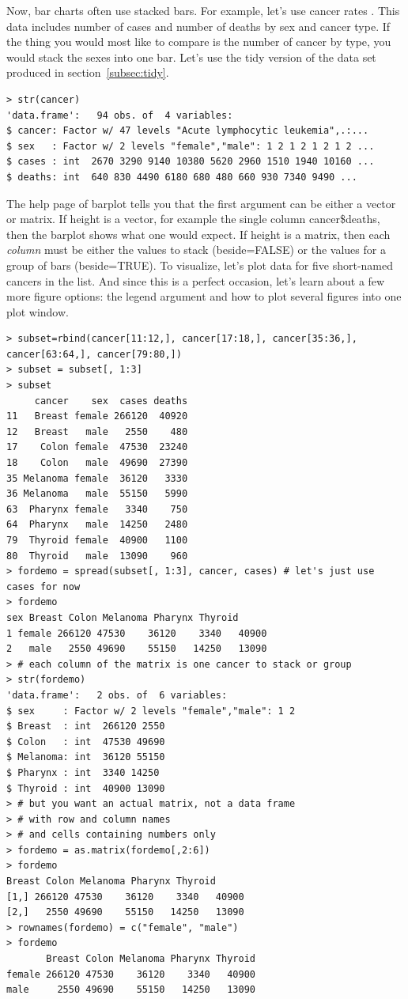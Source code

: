 \documentclass{report}
\newcommand{\code}[1]{\textsf{\ttfamily #1}}
\begin{document}
	Now, bar charts often use stacked bars. For example, let's use cancer rates \cite{cancer}. This data includes number of cases and number of deaths by sex and cancer type. If the thing you would most like to compare is the number of cancer by type, you would stack the sexes into one bar. Let's use the tidy version of the data set produced in section~\ref{subsec:tidy}.
	\begin{verbatim}
> str(cancer)
'data.frame':   94 obs. of  4 variables:
$ cancer: Factor w/ 47 levels "Acute lymphocytic leukemia",.:...
$ sex   : Factor w/ 2 levels "female","male": 1 2 1 2 1 2 1 2 ...
$ cases : int  2670 3290 9140 10380 5620 2960 1510 1940 10160 ...
$ deaths: int  640 830 4490 6180 680 480 660 930 7340 9490 ...
	\end{verbatim}
	The help page of \code{barplot} tells you that the first argument can be either a \code{vector} or \code{matrix}. If \code{height} is a \code{vector}, for example the single column \code{cancer\$deaths}, then the barplot shows what one would expect. If \code{height} is a \code{matrix}, then each \emph{column} must be either the values to stack (\code{beside=FALSE}) or the values for a group of bars (\code{beside=TRUE}). To visualize, let's plot data for five short-named cancers in the list. And since this is a perfect occasion, let's learn about a few more figure options: the \code{legend} argument and how to plot several figures into one plot window.
	\begin{verbatim}
> subset=rbind(cancer[11:12,], cancer[17:18,], cancer[35:36,], cancer[63:64,], cancer[79:80,])
> subset = subset[, 1:3] 
> subset
     cancer    sex  cases deaths
11   Breast female 266120  40920
12   Breast   male   2550    480
17    Colon female  47530  23240
18    Colon   male  49690  27390
35 Melanoma female  36120   3330
36 Melanoma   male  55150   5990
63  Pharynx female   3340    750
64  Pharynx   male  14250   2480
79  Thyroid female  40900   1100
80  Thyroid   male  13090    960
> fordemo = spread(subset[, 1:3], cancer, cases) # let's just use cases for now
> fordemo
sex Breast Colon Melanoma Pharynx Thyroid
1 female 266120 47530    36120    3340   40900
2   male   2550 49690    55150   14250   13090
> # each column of the matrix is one cancer to stack or group
> str(fordemo)
'data.frame':   2 obs. of  6 variables:
$ sex     : Factor w/ 2 levels "female","male": 1 2
$ Breast  : int  266120 2550
$ Colon   : int  47530 49690
$ Melanoma: int  36120 55150
$ Pharynx : int  3340 14250
$ Thyroid : int  40900 13090
> # but you want an actual matrix, not a data frame
> # with row and column names
> # and cells containing numbers only
> fordemo = as.matrix(fordemo[,2:6])
> fordemo
Breast Colon Melanoma Pharynx Thyroid
[1,] 266120 47530    36120    3340   40900
[2,]   2550 49690    55150   14250   13090
> rownames(fordemo) = c("female", "male")
> fordemo
       Breast Colon Melanoma Pharynx Thyroid
female 266120 47530    36120    3340   40900
male     2550 49690    55150   14250   13090
\end{verbatim}
	
\end{document}
